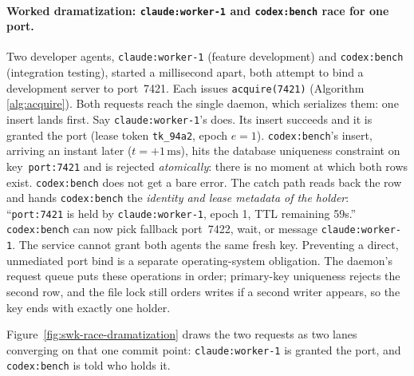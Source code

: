\documentclass[11pt,a4paper]{article}
\theoremstyle{definition}
\theoremstyle{remark}
\begin{document}
\paragraph{Worked dramatization: \texttt{claude:worker-1} and \texttt{codex:bench} race for one port.}
Two developer agents, \texttt{claude:worker-1} (feature development) and \texttt{codex:bench} (integration testing), started a millisecond apart, both attempt to bind a development server to port~7421. Each issues \texttt{acquire(7421)} (Algorithm \ref{alg:acquire}). Both requests reach the single daemon, which serializes them: one insert lands first. Say \texttt{claude:worker-1}'s does. Its insert succeeds and it is granted the port (lease token \texttt{tk\_94a2}, epoch $e=1$). \texttt{codex:bench}'s insert, arriving an instant later ($t = +1\,\text{ms}$), hits the database uniqueness constraint on key~\texttt{port:7421} and is rejected \emph{atomically}: there is no moment at which both rows exist. \texttt{codex:bench} does not get a bare error. The catch path reads back the row and hands \texttt{codex:bench} the \emph{identity and lease metadata of the holder}: ``\texttt{port:7421} is held by \texttt{claude:worker-1}, epoch 1, TTL remaining 59s.'' \texttt{codex:bench} can now pick fallback port~7422, wait, or message \texttt{claude:worker-1}.
The service cannot grant both agents the same fresh key. Preventing a direct,
unmediated port bind is a separate operating-system obligation. The daemon's
request queue puts these operations in order; primary-key uniqueness rejects
the second row, and the file lock still orders writes if a second writer
appears, so the key ends with exactly one holder.



Figure~\ref{fig:swk-race-dramatization} draws the two requests as two lanes
converging on that one commit point: \texttt{claude:worker-1} is granted the port, and \texttt{codex:bench}
is told who holds it.
\end{document}
